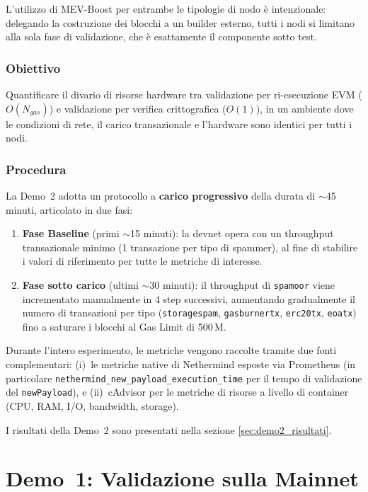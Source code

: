 \documentclass[12pt,a4paper,openright,twoside]{report}
\begin{document}
L'utilizzo di MEV-Boost per entrambe le tipologie di nodo è intenzionale: delegando la costruzione dei blocchi a un builder esterno, tutti i nodi si limitano alla sola fase di validazione, che è esattamente il componente sotto test.

\subsubsection{Obiettivo}

Quantificare il divario di risorse hardware tra validazione per ri-esecuzione EVM ($O(N_{gas})$) e validazione per verifica crittografica ($O(1)$), in un ambiente dove le condizioni di rete, il carico transazionale e l'hardware sono identici per tutti i nodi.

\subsubsection{Procedura}

La Demo~2 adotta un protocollo a \textbf{carico progressivo} della durata di $\sim$45 minuti, articolato in due fasi:

\begin{enumerate}
    \item \textbf{Fase Baseline} (primi $\sim$15 minuti): la devnet opera con un throughput transazionale minimo (1 transazione per tipo di spammer), al fine di stabilire i valori di riferimento per tutte le metriche di interesse.
    \item \textbf{Fase sotto carico} (ultimi $\sim$30 minuti): il throughput di \texttt{spamoor} viene incrementato manualmente in 4 step successivi, aumentando gradualmente il numero di transazioni per tipo (\texttt{storagespam}, \texttt{gasburnertx}, \texttt{erc20tx}, \texttt{eoatx}) fino a saturare i blocchi al Gas Limit di 500\,M.
\end{enumerate}

Durante l'intero esperimento, le metriche vengono raccolte tramite due fonti complementari: (i)~le metriche native di Nethermind esposte via Prometheus (in particolare \texttt{nethermind\_new\_payload\_execution\_time} per il tempo di validazione del \texttt{newPayload}), e (ii)~cAdvisor per le metriche di risorse a livello di container (CPU, RAM, I/O, bandwidth, storage).

I risultati della Demo~2 sono presentati nella sezione \ref{sec:demo2_risultati}.


\section{Demo~1: Validazione sulla Mainnet}\label{sec:demo1_risultati}
\end{document}
